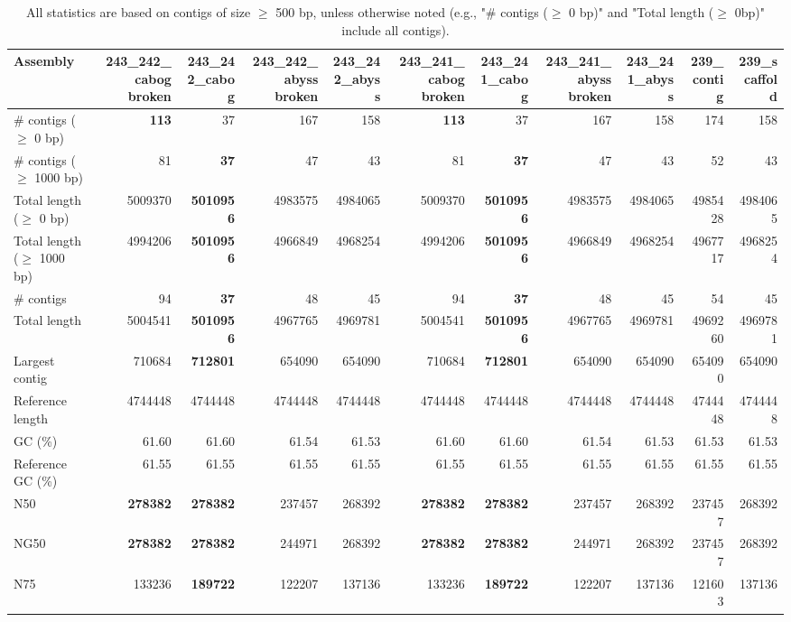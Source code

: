 \documentclass[12pt,a4paper]{article}
\begin{document}
\begin{table}[ht]
\begin{center}
\caption{All statistics are based on contigs of size $\geq$ 500 bp, unless otherwise noted (e.g., "\# contigs ($\geq$ 0 bp)" and "Total length ($\geq$ 0bp)" include all contigs).}
\begin{tabular}{|l*{10}{|r}|}
\hline
Assembly & 243\_242\_cabog broken & 243\_242\_cabog & 243\_242\_abyss broken & 243\_242\_abyss & 243\_241\_cabog broken & 243\_241\_cabog & 243\_241\_abyss broken & 243\_241\_abyss & 239\_contig & 239\_scaffold \\ \hline
\# contigs ($\geq$ 0 bp) & {\bf 113} & 37 & 167 & 158 & {\bf 113} & 37 & 167 & 158 & 174 & 158 \\ \hline
\# contigs ($\geq$ 1000 bp) & 81 & {\bf 37} & 47 & 43 & 81 & {\bf 37} & 47 & 43 & 52 & 43 \\ \hline
Total length ($\geq$ 0 bp) & 5009370 & {\bf 5010956} & 4983575 & 4984065 & 5009370 & {\bf 5010956} & 4983575 & 4984065 & 4985428 & 4984065 \\ \hline
Total length ($\geq$ 1000 bp) & 4994206 & {\bf 5010956} & 4966849 & 4968254 & 4994206 & {\bf 5010956} & 4966849 & 4968254 & 4967717 & 4968254 \\ \hline
\# contigs & 94 & {\bf 37} & 48 & 45 & 94 & {\bf 37} & 48 & 45 & 54 & 45 \\ \hline
Total length & 5004541 & {\bf 5010956} & 4967765 & 4969781 & 5004541 & {\bf 5010956} & 4967765 & 4969781 & 4969260 & 4969781 \\ \hline
Largest contig & 710684 & {\bf 712801} & 654090 & 654090 & 710684 & {\bf 712801} & 654090 & 654090 & 654090 & 654090 \\ \hline
Reference length & 4744448 & 4744448 & 4744448 & 4744448 & 4744448 & 4744448 & 4744448 & 4744448 & 4744448 & 4744448 \\ \hline
GC (\%) & 61.60 & 61.60 & 61.54 & 61.53 & 61.60 & 61.60 & 61.54 & 61.53 & 61.53 & 61.53 \\ \hline
Reference GC (\%) & 61.55 & 61.55 & 61.55 & 61.55 & 61.55 & 61.55 & 61.55 & 61.55 & 61.55 & 61.55 \\ \hline
N50 & {\bf 278382} & {\bf 278382} & 237457 & 268392 & {\bf 278382} & {\bf 278382} & 237457 & 268392 & 237457 & 268392 \\ \hline
NG50 & {\bf 278382} & {\bf 278382} & 244971 & 268392 & {\bf 278382} & {\bf 278382} & 244971 & 268392 & 237457 & 268392 \\ \hline
N75 & 133236 & {\bf 189722} & 122207 & 137136 & 133236 & {\bf 189722} & 122207 & 137136 & 121603 & 137136 \\ \hline

\end{tabular}
\end{center}
\end{table}
\end{document}
